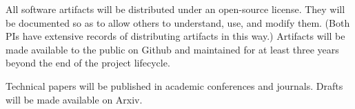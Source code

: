 All software artifacts will be distributed under an open-source
license.  They will be documented so as to allow others to understand,
use, and modify them.  (Both PIs have extensive records of
distributing artifacts in this way.)  Artifacts will be made available
to the public on Github and maintained for at least three years beyond
the end of the project lifecycle.

Technical papers will be published in academic conferences and journals.
Drafts will be made available on Arxiv.


\fi